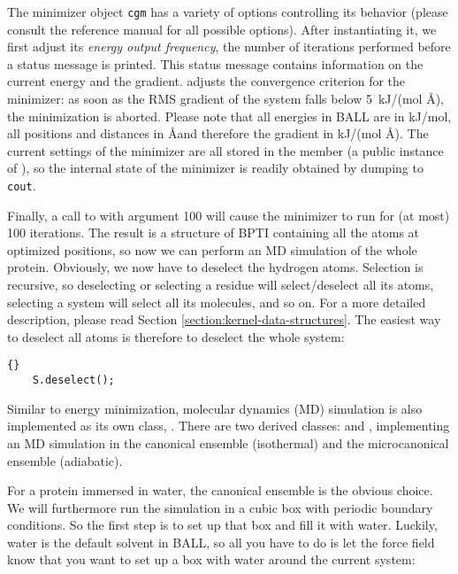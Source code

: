 \noindent
The minimizer object {\tt cgm} has a variety of options controlling its
behavior (please consult the reference manual for all possible options).
After instantiating it, we first adjust its {\em energy output frequency},
\ie the number of iterations performed before a status message is printed.
This status message contains information on the current energy and the
gradient.  adjusts the convergence criterion for the
minimizer: as soon as the RMS gradient of the system falls below 5~kJ/(mol
\AA), the minimization is aborted. Please note that all energies in BALL
are in kJ/mol, all positions and distances in \AA and therefore the gradient
in kJ/(mol \AA). The current settings of the minimizer are all stored in 
the member  (a public instance of 
), so the internal state of the minimizer is readily obtained by
dumping  to {\tt cout}.

Finally, a call to  with argument 100 will cause the
minimizer to run for
(at most) 100 iterations. The result is a structure of BPTI containing all
the atoms at optimized positions, so now we can perform an MD simulation of
the whole protein. Obviously, we now have to deselect the hydrogen atoms.
Selection is recursive, so deselecting or selecting a residue will
select/deselect all its atoms, selecting a system will select all its
molecules, and so on. For a more detailed description, please read Section
\ref{section:kernel-data-structures}. The easiest way to deselect all atoms is
therefore to deselect the whole system:

\begin{lstlisting}{}
	S.deselect();
\end{lstlisting}

\noindent
Similar to energy minimization, molecular dynamics (MD) simulation is also
implemented as its own class, . There are two derived
classes:  and , implementing an MD
simulation in the canonical ensemble (isothermal) and the microcanonical
ensemble (adiabatic). 

For a protein immersed in water, the canonical ensemble is the obvious choice.
We will furthermore run the simulation in a cubic box with periodic boundary 
conditions. So the first step is to set up that box and fill it with water.
Luckily, water is the default solvent in BALL, so all you have to do is
let the force field know that you want to set up a box with water around the
current system:

